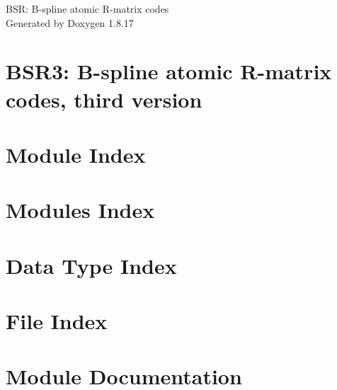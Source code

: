 \let\mypdfximage\pdfximage\def\pdfximage{\immediate\mypdfximage}\documentclass[twoside]{book}
\newcommand{\+}{\discretionary{\mbox{\scriptsize$\hookleftarrow$}}{}{}}
\newcommand{\clearemptydoublepage}{%
  \newpage{\pagestyle{empty}\cleardoublepage}%
}
\begin{document}
\hypersetup{pageanchor=false,
             bookmarksnumbered=true,
             pdfencoding=unicode
            }
\begin{titlepage}
\vspace*{7cm}
\begin{center}%
{\Large B\+SR\+: B-\/spline atomic R-\/matrix codes }\\
\vspace*{1cm}
{\large Generated by Doxygen 1.8.17}\\
\end{center}
\end{titlepage}
\clearemptydoublepage
{}
\tableofcontents
\clearemptydoublepage
{}
\hypersetup{pageanchor=true}

\chapter{B\+S\+R3\+: B-\/spline atomic R-\/matrix codes, third version}
\label{index}\hypertarget{index}{}
\chapter{Module Index}

\chapter{Modules Index}

\chapter{Data Type Index}

\chapter{File Index}

\chapter{Module Documentation}













\end{document}
